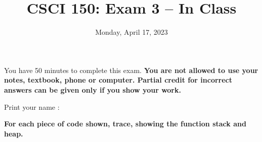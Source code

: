 \documentclass{article}
\begin{document}
\title{CSCI 150: Exam 3 -- In Class}
\author{}
\date{Monday, April 17, 2023}

\maketitle

\thispagestyle{empty}

You  have 50 minutes to complete this exam. \textbf{You are not allowed
  to use your notes, textbook, phone or computer.  Partial credit for
  incorrect answers can be given only if you show your work.}
\bigskip

  \vspace{0.3in}

Print your name : \underline{\phantom{XXXXXXXXXXXXXXXXXXXXXXXXX}}
\vspace{1in}



\newpage

\textbf{For each piece of code shown, trace, showing the function
  stack and heap.}
\end{document}
